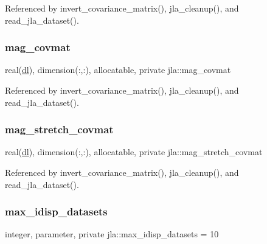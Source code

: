 Referenced by invert\+\_\+covariance\+\_\+matrix(), jla\+\_\+cleanup(), and read\+\_\+jla\+\_\+dataset().

\mbox{\label{namespacejla_a268b540e94d941747a6f2a4ae9db5fc6}} 
\subsubsection{\texorpdfstring{mag\+\_\+covmat}{mag\_covmat}}
{\footnotesize\ttfamily real(\mbox{\hyperlink{namespacejla_a3aa6435b4e08f1d532390186ac608741}{dl}}), dimension(\+:,\+:), allocatable, private jla\+::mag\+\_\+covmat\hspace{0.3cm}{\ttfamily [private]}}



Referenced by invert\+\_\+covariance\+\_\+matrix(), jla\+\_\+cleanup(), and read\+\_\+jla\+\_\+dataset().

\mbox{\label{namespacejla_a6d4dd0b09a0e00323bc4f74df2235901}} 
\subsubsection{\texorpdfstring{mag\+\_\+stretch\+\_\+covmat}{mag\_stretch\_covmat}}
{\footnotesize\ttfamily real(\mbox{\hyperlink{namespacejla_a3aa6435b4e08f1d532390186ac608741}{dl}}), dimension(\+:,\+:), allocatable, private jla\+::mag\+\_\+stretch\+\_\+covmat\hspace{0.3cm}{\ttfamily [private]}}



Referenced by invert\+\_\+covariance\+\_\+matrix(), jla\+\_\+cleanup(), and read\+\_\+jla\+\_\+dataset().

\mbox{\label{namespacejla_a15038ba72bb06d328f2c43f0d0dd5a53}} 
\subsubsection{\texorpdfstring{max\+\_\+idisp\+\_\+datasets}{max\_idisp\_datasets}}
{\footnotesize\ttfamily integer, parameter, private jla\+::max\+\_\+idisp\+\_\+datasets = 10\hspace{0.3cm}{\ttfamily [private]}}




